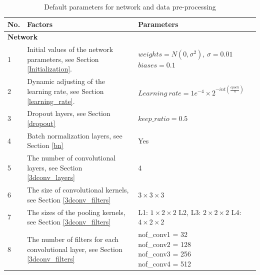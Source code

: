   \begin{table}
  	\caption{Default parameters for network and data pre-processing}
  	\begin{center}
  		\begin{tabular}{| m{0.6cm} | m{7cm} | m{6cm} |}
  			\hline
  			\textbf{No.} & \textbf{Factors} & \textbf{Parameters}  \\ \hline \hline
  			\multicolumn{3}{|l|}{\textbf{Network}}  \\ \hline
  			
  			1 & Initial values of the network parameters, see Section \ref{Initialization}. & \tabincell{l} 
  						{\(weights = N(0,\sigma^2)\), \(\sigma = 0.01\) \\ 
  						 \(biases = 0.1 \)} \\ \hline
  			
  			2 & Dynamic adjusting of the learning rate, see Section \ref{learning_rate}. & \(Learning\ rate = 1e^{-4} \times 2^{-int(\frac{epoch}{4})} \)	\\ \hline
  			
  			3 & Dropout layers, see Section \ref{dropout} & \(keep\_ratio = 0.5\)	\\ \hline
  			
  			4 & Batch normalization layers, see Section \ref{bn} &  Yes  \\ \hline
  			
  			5 & The number of convolutional layers, see Section \ref{3dconv_layers} & 4\\ \hline
  			
  			6 & The size of convolutional kernels, see Section \ref{3dconv_filters} & \(3 \times 3 \times 3\) \\ \hline
  			
  			7 & The sizes of the pooling kernels, see Section \ref{3dconv_filters} & \tabincell{l}
  			                                       {L1: \(1 \times 2 \times 2 \) \\ 
  			                                       	L2, L3: \(2 \times 2 \times 2 \) \\
  				                                    L4: \(4 \times 2 \times 2 \)}   \\ \hline
  			                                    
  			8 &  The number of filters for each convolutional layer, see Section \ref{3dconv_filters} &  \tabincell{l}
  														{nof\_conv1 = 32 \\ 
  														nof\_conv2 = 128 \\
  														nof\_conv3 = 256 \\
  														nof\_conv4 = 512}   \\ \hline
  													

\end{tabular}
\end{center}
\end{table}
